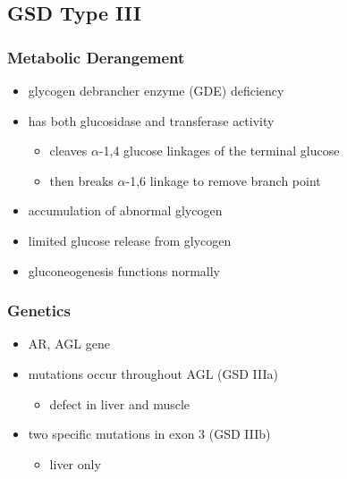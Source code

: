 \documentclass{scrartcl}
\begin{document}
\subsection{GSD Type III}
\label{sec:org5b6c933}
\subsubsection{Metabolic Derangement}
\label{sec:org8497370}
\begin{itemize}
\item glycogen debrancher enzyme (GDE) deficiency
\item has both glucosidase and transferase activity
\begin{itemize}
\item cleaves \(\alpha\)-1,4 glucose linkages of the terminal glucose
\item then breaks \(\alpha\)-1,6 linkage to remove branch point
\end{itemize}
\item accumulation of abnormal glycogen
\item limited glucose release from glycogen
\item gluconeogenesis functions normally
\end{itemize}
\subsubsection{Genetics}
\label{sec:org316b2c3}
\begin{itemize}
\item AR, AGL gene
\item mutations occur throughout AGL (GSD IIIa)
\begin{itemize}
\item defect in liver and muscle
\end{itemize}
\item two specific mutations in exon 3 (GSD IIIb)
\begin{itemize}
\item liver only
\end{itemize}
\end{itemize}
\end{document}
